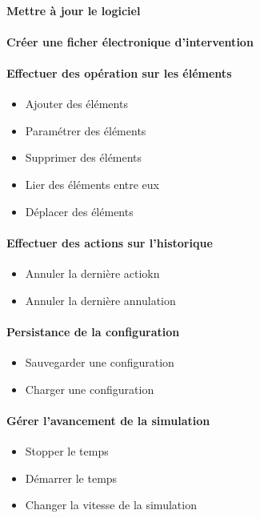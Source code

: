 {
	\paragraph{ Mettre à jour le logiciel }
	\paragraph{ Créer une ficher électronique d'intervention}
}
{
\paragraph{Effectuer des opération sur les éléments }
\begin{itemize}
	\item Ajouter des éléments
	\item Paramétrer des éléments
	\item Supprimer des éléments
	\item Lier des éléments entre eux
	\item Déplacer des éléments
\end{itemize}

\paragraph{Effectuer des actions sur l'historique}
\begin{itemize}
	\item Annuler la dernière actiokn
	\item Annuler la dernière annulation
\end{itemize}

\paragraph{Persistance de la configuration}
\begin{itemize}
	\item Sauvegarder une configuration
	\item Charger une configuration
\end{itemize}

\paragraph{Gérer l'avancement de la simulation}
\begin{itemize}
	\item Stopper le temps
	\item Démarrer le temps
	\item Changer la vitesse de la simulation
\end{itemize}

}
